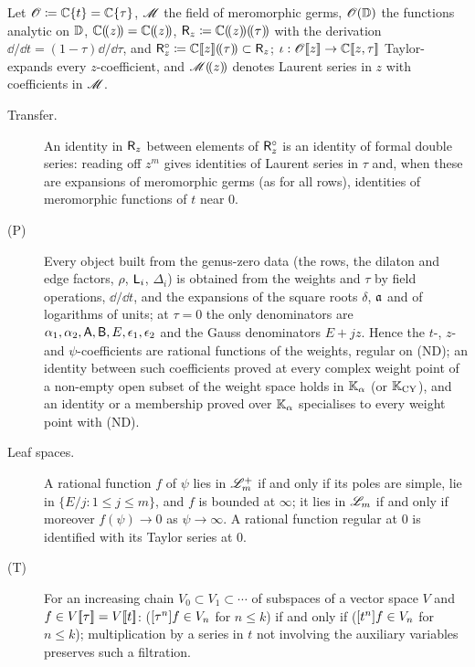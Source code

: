 \begin{lem}
\label{lem:set-rings}
Let $\mathscr{O}\coloneqq\mathbb{C}\{t\}=\mathbb{C}\{\tau\}$, $\mathscr{M}$ the field of meromorphic germs, $\mathscr{O}(\mathbb{D})$ the functions analytic on $\mathbb{D}$, $\mathbb{C}(\!(z)\!)=\mathbb{C}(\!(z)\!)$, $\mathsf{R}_{z}\coloneqq\mathbb{C}(\!(z)\!)(\!(\tau)\!)$ with the derivation $\dd/\dd t=(1-\tau)\dd/\dd\tau$, and $\mathsf{R}_{z}^{\circ}\coloneqq\mathbb{C}[\![ z ]\!](\!(\tau)\!)\subset\mathsf{R}_{z}$; $\iota:\mathscr{O}[\![ z ]\!]\to\mathbb{C}[\![ z,\tau ]\!]$ Taylor-expands every $z$-coefficient, and $\mathscr{M}(\!(z)\!)$ denotes Laurent series in $z$ with coefficients in $\mathscr{M}$.
\begin{description}
\item[Transfer.] An identity in $\mathsf{R}_{z}$ between elements of $\mathsf{R}_{z}^{\circ}$ is an identity of formal double series: reading off $z^m$ gives identities of Laurent series in $\tau$ and, when these are expansions of meromorphic germs (as for all rows), identities of meromorphic functions of $t$ near $0$.
\item[(P)] Every object built from the genus-zero data (the rows, the dilaton and edge factors, $\rho$, $\mathsf{L}_i$, $\Delta_i$) is obtained from the weights and $\tau$ by field operations, $\dd/\dd t$, and the expansions of the square roots $\delta$, $\mathfrak{a}$ and of logarithms of units; at $\tau=0$ the only denominators are $\alpha_1,\alpha_2,\mathsf{A},\mathsf{B},E,\epsilon_1,\epsilon_2$ and the Gauss denominators $E+jz$. Hence the $t$-, $z$- and $\psi$-coefficients are rational functions of the weights, regular on (ND); an identity between such coefficients proved at every complex weight point of a non-empty open subset of the weight space holds in $\mathbb{K}_{\alpha}$ (or $\mathbb{K}_{\mathrm{CY}}$), and an identity or a membership proved over $\mathbb{K}_{\alpha}$ specialises to every weight point with (ND).
\item[Leaf spaces.] A rational function $f$ of $\psi$ lies in $\mathscr{L}_m^+$ if and only if its poles are simple, lie in $\{E/j:1\leq j\leq m\}$, and $f$ is bounded at $\infty$; it lies in $\mathscr{L}_m$ if and only if moreover $f(\psi)\to0$ as $\psi\to\infty$. A rational function regular at $0$ is identified with its Taylor series at $0$.
\item[(T)] For an increasing chain $V_0\subset V_1\subset\cdots$ of subspaces of a vector space $V$ and $f\in V[\![ \tau ]\!]=V[\![ t ]\!]$: ($[\tau^n]f\in V_n$ for $n\leq k$) if and only if ($[t^n]f\in V_n$ for $n\leq k$); multiplication by a series in $t$ not involving the auxiliary variables preserves such a filtration.
\end{description}
\end{lem}


